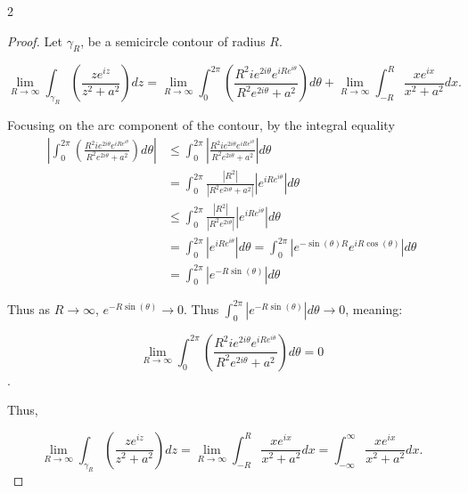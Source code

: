\documentclass{article}
\newcommand{\abs}[1]{\left\lvert #1\right\rvert}
\newcommand*{\lm}[1]{\lim_{#1 \to \infty}}
\begin{document}
\bigskip
\begin{PROB}{2}\label{Problem 2.}
    
\end{PROB}
\begin{proof}
    Let $\gamma_R$, be a semicircle contour of radius $R$. 
    
    \begin{equation}
        \lm{R} \int_{\gamma_R} \left(\frac{ze^{iz}}{z^2 + a^2}\right) dz 
        = \lm{R} \int_{0}^{2 \pi} \left(\frac{R^{2}i e^{2 i \theta} e^{i Re^{i \theta}}}{R^2 e^{2i \theta} + a^2}\right) d \theta + \lm{R} \int_{-R}^{R} \frac{x e^{ix}}{x^2 + a^2} dx.
    \end{equation}

    Focusing on the arc component of the contour, by the integral equality
    \begin{align*}
        \abs{\int_{0}^{2 \pi} \left(\frac{R^{2}i e^{2i \theta} e^{i Re^{i \theta}}}{R^2 e^{2i \theta} + a^2}\right) d \theta} 
        &\leq \int_{0}^{2 \pi} \abs{\frac{R^{2}i e^{2i \theta} e^{i Re^{i \theta}}}{R^2 e^{2i \theta} + a^2}} d \theta \\
        &= \int_{0}^{2 \pi} \frac{\abs{R^2}}{\abs{R^2e^{2 i \theta} + a^2}} \abs{e^{i Re^{i \theta}}} d \theta \\
        &\leq \int_{0}^{2 \pi} \frac{\abs{R^2}}{\abs{R^2e^{2 i \theta}}} \abs{e^{i Re^{i \theta}}} d \theta \\
        &= \int_{0}^{2 \pi} \abs{e^{iRe^{i \theta}}} d \theta = \int_{0}^{2 \pi}\abs{e^{-\sin(\theta)R} e^{i R \cos(\theta)}} d \theta\\
        &= \int_{0}^{2 \pi} \abs{e^{-R \sin(\theta)}} d \theta
    \end{align*}

    Thus as $R \to \infty$, $e^{-R \sin(\theta)} \to 0$. Thus $\int_{0}^{2 \pi} \abs{e^{-R \sin(\theta)}} d \theta \to 0$, meaning:  

    \begin{equation}
        \lm{R} \int_{0}^{2 \pi} \left(\frac{R^{2}i e^{2i \theta} e^{i Re^{i \theta}}}{R^2 e^{2i \theta} + a^2}\right) d \theta = 0
    \end{equation}. 

    Thus, 

    \begin{equation}
        \lm{R} \int_{\gamma_R} \left(\frac{ze^{iz}}{z^2 + a^2}\right) dz 
        = \lm{R} \int_{-R}^{R} \frac{x e^{ix}}{x^2 + a^2} dx = \int_{-\infty}^{\infty} \frac{x e^{ix}}{x^2 + a^2} dx.
    \end{equation}


\end{proof}
\end{document}
